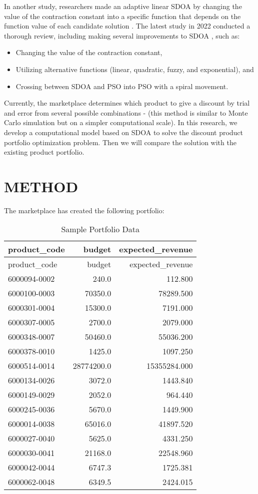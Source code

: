 \documentclass[preprint, 3p,
authoryear]{elsarticle} %
\providecommand{\tightlist}{%
  \setlength{\itemsep}{0pt}\setlength{\parskip}{0pt}}
\begin{document}
In another study, researchers made an adaptive linear SDOA by changing
the value of the contraction constant into a specific function that
depends on the function value of each candidate solution \citep{sdoa2}.
The latest study in 2022 conducted a thorough review, including making
several improvements to SDOA \citep{sdoa3}, such as:

\begin{itemize}
\tightlist
\item
  Changing the value of the contraction constant,
\item
  Utilizing alternative functions (linear, quadratic, fuzzy, and
  exponential), and
\item
  Crossing between SDOA and PSO into PSO with a spiral movement.
\end{itemize}

Currently, the marketplace determines which product to give a discount
by trial and error from several possible combinations - (this method is
similar to Monte Carlo simulation but on a simpler computational scale).
In this research, we develop a computational model based on SDOA to
solve the discount product portfolio optimization problem. Then we will
compare the solution with the existing product portfolio.

\hypertarget{method}{%
\section{METHOD}\label{method}}

The marketplace has created the following portfolio:

\begin{longtable}[]{@{}lrr@{}}
\caption{Sample Portfolio Data}\tabularnewline
\toprule()
product\_code & budget & expected\_revenue \\
\midrule()
\endfirsthead
\toprule()
product\_code & budget & expected\_revenue \\
\midrule()
\endhead
6000094-0002 & 240.0 & 112.800 \\
6000100-0003 & 70350.0 & 78289.500 \\
6000301-0004 & 15300.0 & 7191.000 \\
6000307-0005 & 2700.0 & 2079.000 \\
6000348-0007 & 50460.0 & 55036.200 \\
6000378-0010 & 1425.0 & 1097.250 \\
6000514-0014 & 28774200.0 & 15355284.000 \\
6000134-0026 & 3072.0 & 1443.840 \\
6000149-0029 & 2052.0 & 964.440 \\
6000245-0036 & 5670.0 & 1449.900 \\
6000014-0038 & 65016.0 & 41897.520 \\
6000027-0040 & 5625.0 & 4331.250 \\
6000030-0041 & 21168.0 & 22548.960 \\
6000042-0044 & 6747.3 & 1725.381 \\
6000062-0048 & 6349.5 & 2424.015 \\
\bottomrule()
\end{longtable}
\end{document}
